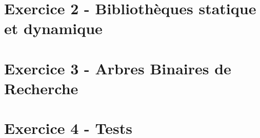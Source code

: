 \documentclass[12pt,a4paper]{article}
\begin{document}
\vspace*{0.7cm}



\clearpage

\section{Exercice 2 - Bibliothèques statique et dynamique}

\vspace*{0.7cm}



\clearpage

\section{Exercice 3 - Arbres Binaires de Recherche}

\vspace*{0.7cm}



\clearpage

\section{Exercice 4 - Tests}

\vspace*{0.7cm}



\clearpage

%
%
%
\end{document}
